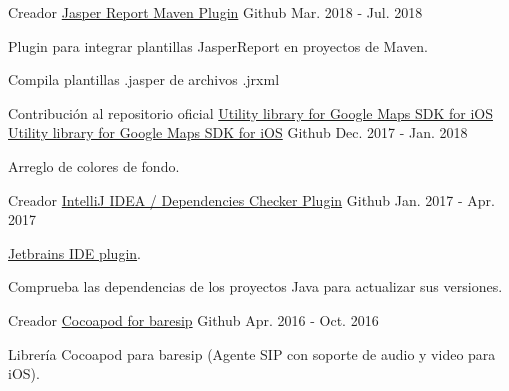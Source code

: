 \begin{cventries}
  \cventry
    {Creador} %
    {\href{https://github.com/h4j4x/jasperreport-maven-plugin}{Jasper Report Maven Plugin}} %
    {\faGithubSquare\acvHeaderIconSep Github} %
    {Mar. 2018 - Jul. 2018} %
    {
      \begin{cvitems} %
        \item {Plugin para integrar plantillas JasperReport en proyectos de Maven.}
        \item {Compila plantillas .jasper de archivos .jrxml}
      \end{cvitems}
    }

  \cventry
    {Contribución al repositorio oficial \href{https://github.com/googlemaps/google-maps-ios-utils}{Utility library for Google Maps SDK for iOS}} %
    {\faMapMarker \hphantom{-} \href{https://github.com/h4j4x/google-maps-ios-utils}{Utility library for Google Maps SDK for iOS}} %
    {\faGithubSquare\acvHeaderIconSep Github} %
    {Dec. 2017 - Jan. 2018} %
    {
      \begin{cvitems} %
        \item {Arreglo de colores de fondo.}
      \end{cvitems}
    }

  \cventry
    {Creador} %
    {\href{https://github.com/h4j4x/deps-checker}{IntelliJ IDEA / Dependencies Checker Plugin}} %
    {\faGithubSquare\acvHeaderIconSep Github} %
    {Jan. 2017 - Apr. 2017} %
    {
      \begin{cvitems} %
        \item {\href{https://plugins.jetbrains.com/plugin/9481-java-dependencies-checker}{Jetbrains IDE plugin}.}
        \item {Comprueba las dependencias de los proyectos Java para actualizar sus versiones.}
      \end{cvitems}
    }

  \cventry
    {Creador} %
    {\faMobile \hphantom{-} \href{https://github.com/h4j4x/taresip}{Cocoapod for baresip}} %
    {\faGithubSquare\acvHeaderIconSep Github} %
    {Apr. 2016 - Oct. 2016} %
    {
      \begin{cvitems} %
        \item {Librería Cocoapod para baresip (Agente SIP con soporte de audio y video para iOS).}
      \end{cvitems}
    }


\end{cventries}
